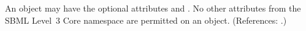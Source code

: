 An \AlgebraicRule object may have the optional attributes 
and .  No other attributes from the SBML Level~3 Core
namespace are permitted on an \AlgebraicRule object.  (References: .)
